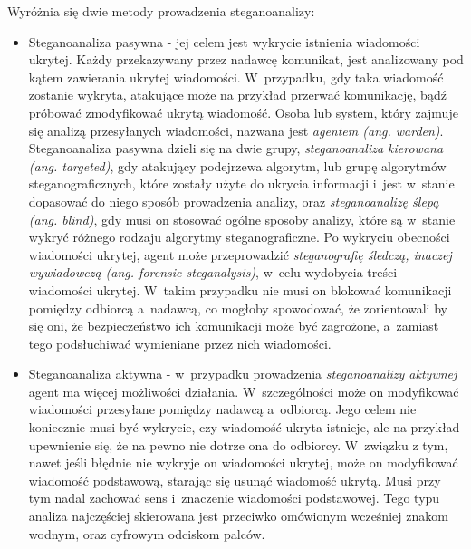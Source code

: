 \documentclass[a4paper, twoside, 12pt]{report}
\begin{document}
        Wyróżnia się dwie metody prowadzenia steganoanalizy:
        \begin{itemize}
            \item Steganoanaliza pasywna - jej celem jest wykrycie istnienia wiadomości ukrytej.
                Każdy przekazywany
        przez nadawcę komunikat, jest analizowany pod kątem zawierania ukrytej wiadomości.
        W~przypadku, gdy taka wiadomość zostanie wykryta, atakujące może na przykład przerwać komunikację,
        bądź próbować zmodyfikować ukrytą wiadomość.
        Osoba lub system,
        który zajmuje się analizą przesyłanych wiadomości, nazwana jest \emph{agentem (ang. warden)}.
        Steganoanaliza pasywna dzieli się na dwie grupy, \emph{steganoanaliza kierowana (ang. targeted)}, gdy
        atakujący podejrzewa algorytm, lub grupę algorytmów steganograficznych,
        które zostały użyte do ukrycia informacji i~jest w~stanie dopasować do
        niego sposób prowadzenia analizy, oraz \emph{steganoanalizę ślepą (ang. blind)},
        gdy musi on stosować ogólne sposoby analizy, które są w~stanie wykryć różnego
        rodzaju algorytmy steganograficzne. Po wykryciu obecności wiadomości ukrytej,
        agent może przeprowadzić \emph{steganografię śledczą, inaczej wywiadowczą (ang. forensic steganalysis)},
        w~celu wydobycia treści wiadomości ukrytej. W~takim przypadku nie musi on
        blokować komunikacji pomiędzy odbiorcą a~nadawcą, co mogłoby spowodować,
        że zorientowali by się oni, że bezpieczeństwo ich komunikacji może być zagrożone,
        a~zamiast tego podsłuchiwać wymieniane przez nich wiadomości.

            \item Steganoanaliza aktywna - w~przypadku prowadzenia \emph{steganoanalizy aktywnej} agent ma więcej możliwości
        działania. W~szczególności może on modyfikować wiadomości przesyłane pomiędzy
        nadawcą a~odbiorcą. Jego celem nie koniecznie musi być wykrycie, czy wiadomość
        ukryta istnieje, ale na przykład upewnienie się, że na pewno nie dotrze ona
        do odbiorcy. W~związku z tym, nawet jeśli błędnie nie wykryje on wiadomości ukrytej,
        może on modyfikować wiadomość podstawową, starając się usunąć wiadomość ukrytą.
        Musi przy tym  nadal zachować sens i~znaczenie wiadomości podstawowej. Tego typu analiza
        najczęściej skierowana jest przeciwko omówionym wcześniej znakom wodnym,
        oraz cyfrowym odciskom palców\cite[Rozdział 13]{DIGITALWATERMARKING}.
    \end{itemize}
\end{document}
